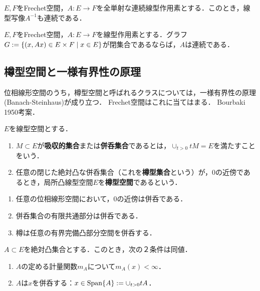 \documentclass[uplatex,dvipdfmx]{jsreport}
\begin{document}
\begin{corollary}[逆写像定理]
    $E,F$をFrechet空間，$A:E\to F$を全単射な連続線型作用素とする．このとき，線型写像$A^{-1}$も連続である．
\end{corollary}

\begin{theorem}[閉グラフ定理]
    $E,F$をFrechet空間，$A:E\to F$を線型作用素とする．グラフ$G:=\left\{(x,Ax)\in E\times F\mid x\in E\right\}$が閉集合であるならば，$A$は連続である．
\end{theorem}

\subsection{樽型空間と一様有界性の原理}

\begin{tcolorbox}[colframe=ForestGreen, colback=ForestGreen!10!white,breakable,colbacktitle=ForestGreen!40!white,coltitle=black,fonttitle=\bfseries\sffamily,
title=]
    位相線形空間のうち，樽型空間と呼ばれるクラスについては，一様有界性の原理(Banach-Steinhaus)が成り立つ．
    Frechet空間はこれに当てはまる．
    Bourbaki 1950考案．
\end{tcolorbox}

\begin{definition}\label{def-barrel}
    $E$を線型空間とする．
    \begin{enumerate}
        \item $M\subset E$が\textbf{吸収的集合}または\textbf{併呑集合}であるとは，$\cup_{t>0}tM=E$を満たすことをいう．
        \item 任意の閉じた絶対凸な併呑集合（これを\textbf{樽型集合}という）が，$0$の近傍であるとき，局所凸線型空間$E$を\textbf{樽型空間}であるという．
    \end{enumerate}
\end{definition}

\begin{lemma}\mbox{}
    \begin{enumerate}
        \item 任意の位相線形空間において，$0$の近傍は併呑である．
        \item 併呑集合の有限共通部分は併呑である．
        \item 樽は任意の有界完備凸部分空間を併呑する．
    \end{enumerate}
\end{lemma}

\begin{lemma}[併呑性の特徴付け]\label{lemma-characterizing-absorbant}
    $A\subset E$を絶対凸集合とする．このとき，次の２条件は同値．
    \begin{enumerate}
        \item $A$の定める計量関数$m_A$について$m_A(x)<\infty$．
        \item $A$は$x$を併呑する：$x\in\mathrm{Span}\{A\}:=\cup_{t>0}tA$．
    \end{enumerate}
\end{lemma}
\end{document}
